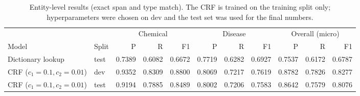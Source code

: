 \begin{table}[t]
\centering
\small\setlength{\tabcolsep}{3.6pt}
\caption{Entity-level results (exact span and type match). The CRF is trained on the training split only; hyperparameters were chosen on dev and the test set was used for the final numbers.}
\label{tab:results}
\begin{tabular}{llrrrrrrrrr}
\toprule
 & & \multicolumn{3}{c}{Chemical} & \multicolumn{3}{c}{Disease} & \multicolumn{3}{c}{Overall (micro)} \\
\cmidrule(lr){3-5}\cmidrule(lr){6-8}\cmidrule(lr){9-11}
Model & Split & P & R & F1 & P & R & F1 & P & R & F1 \\
\midrule
Dictionary lookup & test & 0.7389 & 0.6082 & 0.6672 & 0.7719 & 0.6282 & 0.6927 & 0.7537 & 0.6172 & 0.6787 \\
CRF ($c_1{=}0.1,c_2{=}0.01$) & dev & 0.9352 & 0.8309 & 0.8800 & 0.8069 & 0.7217 & 0.7619 & 0.8782 & 0.7826 & 0.8277 \\
CRF ($c_1{=}0.1,c_2{=}0.01$) & test & 0.9194 & 0.7885 & 0.8489 & 0.8002 & 0.7206 & 0.7583 & 0.8642 & 0.7579 & 0.8076 \\
\bottomrule
\end{tabular}
\end{table}
